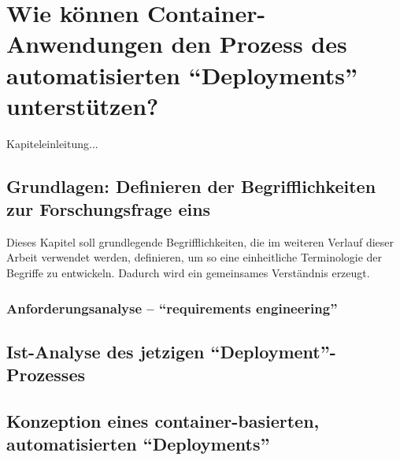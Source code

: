 \chapter{Wie können Container-Anwendungen den Prozess des automatisierten \enquote{Deployments} unterstützen?}
Kapiteleinleitung...

\section{Grundlagen: Definieren der Begrifflichkeiten zur Forschungsfrage eins}
Dieses Kapitel soll grundlegende Begrifflichkeiten, die im weiteren Verlauf dieser Arbeit verwendet werden, definieren, um so eine einheitliche Terminologie der Begriffe zu entwickeln. Dadurch wird ein gemeinsames Verständnis erzeugt.

\subsection{Anforderungsanalyse -- \enquote{requirements engineering}}

\section{Ist-Analyse des jetzigen \enquote{Deployment}-Prozesses}

\section{Konzeption eines container-basierten, automatisierten \enquote{Deployments}}